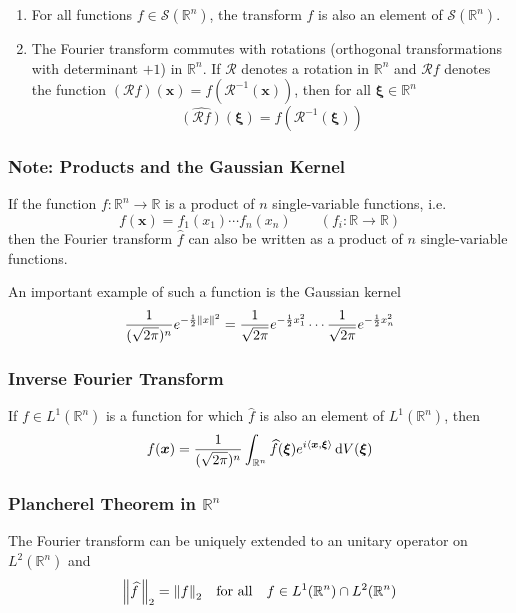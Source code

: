\documentclass[11pt, a4paper]{article}
\newcommand{\diff}{\mathop{}\!\mathrm{d}} %
\newcommand{\R}{\mathbb{R}} %
\begin{document}
\begin{enumerate}
	\item For all functions $ f \in \mathcal{S}(\R^n) $, the transform $ \widehat{f} $ is also an element of $ \mathcal{S}(\R^n) $.
	
	\item The Fourier transform commutes with rotations (orthogonal transformations with determinant $ +1 $) in $ \R^n $. If $ \mathcal{R} $ denotes a rotation in $ \R^n $ and $ \mathcal{R}f $ denotes the function $ (\mathcal{R}f)(\bm{x}) = f\left(\mathcal{R}^{-1}(\bm{x}) \right) $, then for all $ \bm{\xi} \in \R^n $
	\begin{equation*}
		\widehat{(\mathcal{R}f)}(\bm{\xi}) = \widehat{f}\left (\mathcal{R}^{-1} (\bm{\xi})\right )
	\end{equation*}
\end{enumerate}

\subsubsection{Note: Products and the Gaussian Kernel}
If the function $ f: \R^n \to \R $ is a product of $ n $ single-variable functions, i.e.
\begin{equation*}
	f(\bm{x}) = f_1(x_1) \cdots f_n(x_n) \qquad (f_i: \R \to \R)
\end{equation*}
then the Fourier transform $ \widehat{f} $ can also be written as a product of $ n $ single-variable functions.

An important example of such a function is the Gaussian kernel
\begin{align*}
	\frac{1}{(\sqrt{2\pi})^n} e^{-\frac{1}{2}\norm{x}^2} = \frac{1}{\sqrt{2\pi}} e^{-\frac{1}{2}x_1^2} \cdots  \frac{1}{\sqrt{2\pi}} e^{-\frac{1}{2}x_n^2}
\end{align*}

\subsubsection{Inverse Fourier Transform}
If $ f \in L^{1}(\R^n) $ is a function for which $ \widehat{f} $ is also an element of $  L^{1}(\R^n) $, then
\begin{equation*}
	f(\bm{x}) =	\frac{1}{(\sqrt{2\pi})^n} \int_{\R^n} \widehat{f}(\bm{\xi}) e^{i\expval{\bm{x}, \bm{\xi}}} \diff V(\bm{\xi})
\end{equation*}

\subsubsection{Plancherel Theorem in $ \R^n $}
The Fourier transform can be uniquely extended to an unitary operator on $ L^2(\R^n) $ and
\begin{equation*}
	\norm{\widehat{f}\,}_{2} = \norm{f}_{2} \quad \text{for all} \quad f \in L^1(\R^n) \cap L^2(\R^n)
\end{equation*}
\end{document}
